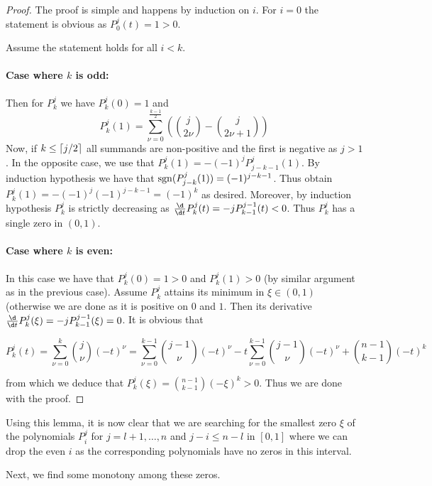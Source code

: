 \documentclass[a4paper]{article}
\begin{document}
\begin{proof}
  The proof is simple and happens by induction on $i$. For $i=0$ the statement is obvious as $P_0^j(t)=1>0$.

  Assume the statement holds for all $i<k$. 
  \paragraph{Case where $k$ is odd:}
  Then for $P_k^j$ we have $P_k^j(0)=1$ and
  \begin{equation}
    P_k^j(1)=\sum_{\nu=0}^{\frac{k-1}{2}}{\left(\binom{j}{2\nu}-\binom{j}{2\nu+1}\right)}
  \end{equation}
  Now, if $k\leq \left\lceil j/2\right\rceil$ all summands are non-positive and the first is negative as $j>1$. In the opposite case, we use that $P_k^j(1)=-(-1)^jP_{j-k-1}^j(1)$. By induction hypothesis we have that $\mathop\mathrm{sgn}(P_{j-k}^j(1))=(-1)^{j-k-1}$. Thus obtain $P_k^j(1)=-(-1)^j(-1)^{j-k-1}=(-1)^k$ as desired. Moreover, by induction hypothesis $P_k^j$ is strictly decreasing as $\frac{\d}{\d t}P_k^j(t)=-jP_{k-1}^{j-1}(t)<0$. Thus $P_k^j$ has a single zero in $(0,1)$.
  \paragraph{Case where $k$ is even:} In this case we have that $P_k^j(0)=1>0$ and $P_k^j(1)>0$ (by similar argument as in the previous case). Assume $P_k^j$ attains its minimum in $\xi\in(0,1)$ (otherwise we are done as it is positive on $0$ and $1$. Then its derivative $\frac{\d}{\d t}P_k^j(\xi)=-jP_{k-1}^{j-1}(\xi)=0$. It is obvious that

  \begin{equation}
    P_k^j(t)=\sum_{\nu=0}^k{\binom{j}{\nu}(-t)^\nu}=\sum_{\nu=0}^{k-1}{\binom{j-1}{\nu}(-t)^\nu}-t\sum_{\nu=0}^{k-1}{\binom{j-1}{\nu}(-t)^\nu}+\binom{n-1}{k-1}(-t)^k
  \end{equation}

  from which we deduce that $P_k^j(\xi)=\binom{n-1}{k-1}(-\xi)^k>0$. Thus we are done with the proof.
\end{proof}

Using this lemma, it is now clear that we are searching for the smallest zero $\xi$ of the polynomials $P_i^j$ for $j=l+1,\ldots,n$ and $j-i\leq n-l$ in $[0,1]$ where we can drop the even $i$ as the corresponding polynomials have no zeros in this interval. 

Next, we find some monotony among these zeros.
\end{document}
